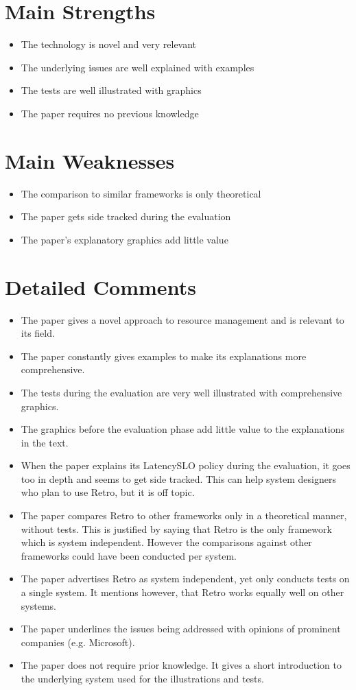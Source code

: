 \documentclass[a4paper]{article}
\begin{document}
\section{Main Strengths}
\begin{itemize}
	\setlength{\itemsep}{-2pt}
	\item The technology is novel and very relevant
	\item The underlying issues are well explained with examples
	\item The tests are well illustrated with graphics
	\item The paper requires no previous knowledge
\end{itemize}

\section{Main Weaknesses}
\begin{itemize}
	\setlength{\itemsep}{-2pt}
	\item The comparison to similar frameworks is only theoretical
	\item The paper gets side tracked during the evaluation
	\item The paper's explanatory graphics add little value
\end{itemize}

\section{Detailed Comments}
\begin{itemize}
	\setlength{\itemsep}{-2pt}
	\item The paper gives a novel approach to resource management and is relevant to its field.
	\item The paper constantly gives examples to make its explanations more comprehensive.
	\item The tests during the evaluation are very well illustrated with comprehensive graphics.
	\item The graphics before the evaluation phase add little value to the explanations in the text.
	\item When the paper explains its LatencySLO policy during the evaluation, it goes too in depth and seems to get side tracked. This can help system designers who plan to use Retro, but it is off topic.
	\item The paper compares Retro to other frameworks only in a theoretical manner, without tests. This is justified by saying that Retro is the only framework which is system independent. However the comparisons against other frameworks could have been conducted per system.
	\item The paper advertises Retro as system independent, yet only conducts tests on a single system. It mentions however, that Retro works equally well on other systems.
	\item The paper underlines the issues being addressed with opinions of prominent companies (e.g. Microsoft).
	\item The paper does not require prior knowledge. It gives a short introduction to the underlying system used for the illustrations and tests.
\end{itemize}
\end{document}
